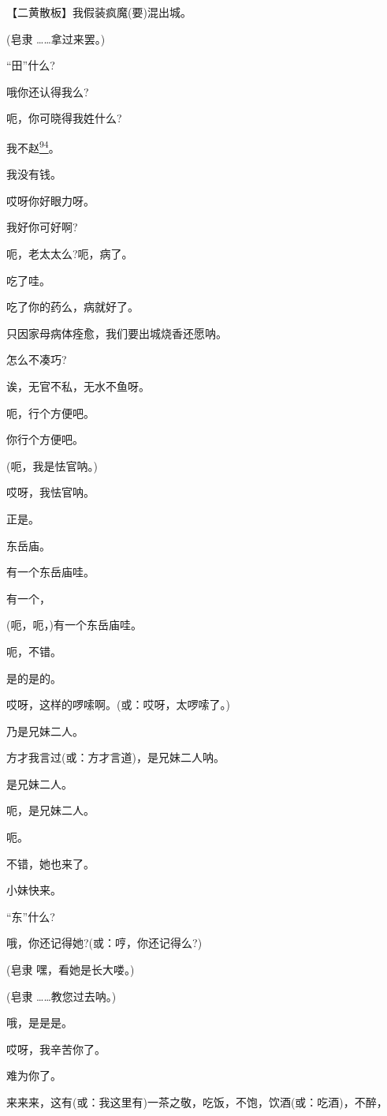 【二黄散板】我假装疯魔(要)混出城。

(皂隶 \ldots{}\ldots{}拿过来罢。)

``田''什么?

哦你还认得我么?

呃，你可晓得我姓什么?

我不赵\protect\hyperlink{fn94}{\textsuperscript{94}}。

我没有钱。

哎呀你好眼力呀。

我好你可好啊?

呃，老太太么?呃，病了。

吃了哇。

吃了你的药么，病就好了。

只因家母病体痊愈，我们要出城烧香还愿呐。

怎么不凑巧?

诶，无官不私，无水不鱼呀。

呃，行个方便吧。

你行个方便吧。

(呃，我是怯官呐。)

哎呀，我怯官呐。

正是。

东岳庙。

有一个东岳庙哇。

有一个，

(呃，呃，)有一个东岳庙哇。

呃，不错。

是的是的。

哎呀，这样的啰嗦啊。(或：哎呀，太啰嗦了。)

乃是兄妹二人。

方才我言过(或：方才言道)，是兄妹二人呐。

是兄妹二人。

呃，是兄妹二人。

呃。

不错，她也来了。

小妹快来。

``东''什么?

哦，你还记得她?(或：哼，你还记得么?)

(皂隶 嘿，看她是长大喽。)

(皂隶 \ldots{}\ldots{}教您过去呐。)

哦，是是是。

哎呀，我辛苦你了。

难为你了。

来来来，这有(或：我这里有)一茶之敬，吃饭，不饱，饮酒(或：吃酒)，不醉，

